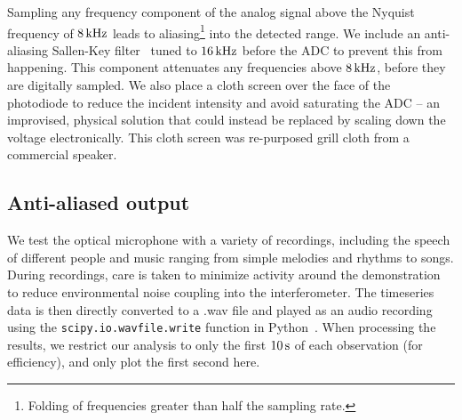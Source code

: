 \documentclass[paper-main.tex]{subfiles}
\begin{document}
Sampling any frequency component of the analog signal above the Nyquist frequency of $8\,{\rm kHz}$ leads to aliasing\footnote{Folding of frequencies greater than half the sampling rate.} into the detected range. We include an anti-aliasing Sallen-Key filter~\cite{sallen_key_filter} tuned to $16\,{\rm kHz}$ before the ADC to prevent this from happening.
This component attenuates any frequencies above $8\,{\rm kHz}$, before they are digitally sampled. We also place a cloth screen over the face of the photodiode to reduce the incident intensity and avoid saturating the ADC -- an improvised, physical solution that could instead be replaced by scaling down the voltage electronically. This cloth screen was re-purposed grill cloth from a commercial speaker.


\subsection{Anti-aliased output}
\label{sec:initialResultsOpMic}

We test the optical microphone with a variety of recordings, including the speech of different people and music ranging from simple melodies and rhythms to songs. 
During recordings, care is taken to minimize activity around the demonstration to reduce environmental noise coupling into the interferometer. 
The timeseries data is then directly converted to a .wav file and played as an audio recording using the \texttt{scipy.io.wavfile.write} function in Python~\cite{scipy,python}. 
When processing the results, we restrict our analysis to only the first $10\,{\rm s}$ of each observation (for efficiency), and only plot the first second here. 
\end{document}
